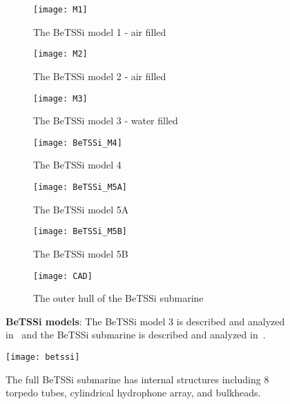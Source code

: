 \begin{figure}
	\centering
	\begin{subfigure}{\textwidth}
		\centering
		\texttt{[image: M1]} %
		\caption{The BeTSSi model 1 - air filled}
	\end{subfigure}%
	\par\bigskip
	\par\bigskip
	\begin{subfigure}{\textwidth}
		\centering
		\texttt{[image: M2]} %
		\caption{The BeTSSi model 2 - air filled}
	\end{subfigure}%
	\par\bigskip
	\par\bigskip
	\begin{subfigure}{\textwidth}
		\centering
		\texttt{[image: M3]} %
		\caption{The BeTSSi model 3 - water filled}
		\label{Fig:BeTSSi_M3}
	\end{subfigure}%
	\par\bigskip
	\par\bigskip
	\begin{subfigure}{0.33\textwidth}
		\centering
		\texttt{[image: BeTSSi\_M4]} %
		\caption{The BeTSSi model 4}
	\end{subfigure}%
	\hspace*{0.005\textwidth}%
	\begin{subfigure}{0.33\textwidth}
		\centering
		\texttt{[image: BeTSSi\_M5A]}
		\caption{The BeTSSi model 5A}
	\end{subfigure}%
	\hspace*{0.005\textwidth}%
	\begin{subfigure}{0.33\textwidth}
		\centering
		\texttt{[image: BeTSSi\_M5B]}
		\caption{The BeTSSi model 5B}
	\end{subfigure}
	\par\bigskip
	\par\bigskip
	\begin{subfigure}{\textwidth}
		\centering
		\texttt{[image: CAD]}
		\caption{The outer hull of the BeTSSi submarine}
	\end{subfigure}
	\caption{\textbf{BeTSSi models}: The BeTSSi model 3 is described and analyzed in~\cite{Venas2015iao} and the BeTSSi submarine is described and analyzed in~\cite{Venas2019ibe}.}
	\label{Fig:BeTSSiModels}
\end{figure}
\begin{figure}
	\centering
	\texttt{[image: betssi]}
	\caption{The full BeTSSi submarine has internal structures including 8 torpedo tubes, cylindrical hydrophone array, and bulkheads.}
	\label{Fig:FullBeTSSi}
\end{figure}

